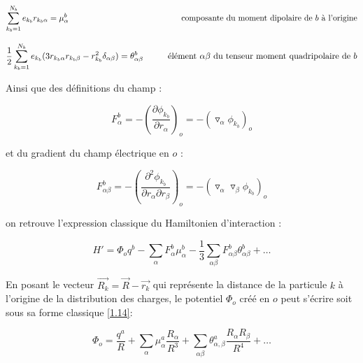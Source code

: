 \documentclass[12pt,a4paper]{book}
\begin{document}
	\begin{flushleft}
		\begin{equation*}
		\sum_{k_{b}=1}^{N_{b}} e_{k_{b}} r_{k_{b}\alpha} = \mu_{\alpha}^{b}  \hspace{4.8cm} \textup{composante du moment dipolaire de $b$ à l'origine}
		\end{equation*}
	\end{flushleft}
	
	
	\begin{flushleft}
		\begin{equation*}
		\frac{1}{2} \sum_{k_{b}=1}^{N_{b}} e_{k_{b}} (3r_{k_{b}\alpha} r_{k_{b}\beta}- r^{2}_{k_{b}}\delta_{\alpha \beta}) = \theta_{\alpha \beta}^{b}  \hspace{1cm} \textup{élément $\alpha\beta$ du tenseur moment quadripolaire de $b$}
		\end{equation*}
	\end{flushleft}
	
	Ainsi que des définitions du champ :
	
	\begin{equation}
	F_{\alpha}^{b} = - \left(\frac{\partial \phi_{k_{b}}}{\partial r_{\alpha}}\right)_{o} = - (\triangledown_{\alpha} \phi_{k_{b}})_{o} \label{1.11}
	\end{equation}
	
	et du gradient du champ électrique en $o$ : 
	
	\begin{equation}
	F_{\alpha\beta}^{b} = - \left(\frac{\partial^{2} \phi_{k_{b}}}{\partial r_{\alpha} \partial r_{\beta}}\right)_{o} = - (\triangledown_{\alpha} \triangledown_{\beta} \phi_{k_{b}})_{o} \label{1.12}
	\end{equation}
	
	on retrouve l'expression classique du Hamiltonien d'interaction : 
	
	\begin{equation}
	H' = \Phi_{o} q^{b} - \sum_{\alpha} F_{\alpha}^{b} \mu_{\alpha}^{b} - \frac{1}{3} \sum_{\alpha\beta} F_{\alpha\beta}^{b} \theta_{\alpha\beta}^{b} + \ldots
	\end{equation}
	
	En posant le vecteur $\overrightarrow{R_{k}}= \overrightarrow{R} - \overrightarrow{r_{k}}$ qui représente la distance de la particule $k$ à l'origine de la distribution des charges, le potentiel $\Phi_{o}$ créé en $o$ peut s'écrire soit sous sa forme classique \ref{1.14}:
	
	\begin{equation}
	\Phi_{o} = \frac{q^{a}}{R} + \sum_{\alpha} \mu_{\alpha}^{a} \frac{R_{\alpha}}{R^{3}} + \sum_{\alpha\beta} \theta_{\alpha,\beta}^{a} \frac{R_{\alpha} R_{\beta}}{R^{4}} + \ldots \label{1.14}
	\end{equation}
	
\end{document}
